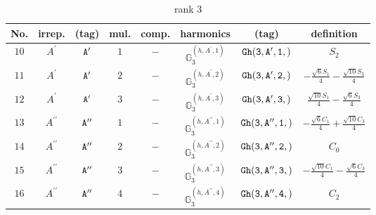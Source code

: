 \documentclass[fleqn,8pt]{jsarticle}
\begin{document}
\begin{table}[ht!]
\begin{center}
\caption{rank 3}
\renewcommand{\arraystretch}{1.3}
\begin{tabular}{cccccccc} \hline \hline
No. & irrep. & (tag) & mul. & comp. & harmonics & (tag) & definition \\ \hline
$ 10 $ & $ A^{\prime} $ & $ {\tt A'} $ & $ 1 $ & $ - $ & $ \mathbb{G}_{3}^{(h,A^{\prime},1)} $ & $ {\tt Gh(3,A',1,)} $ & $ S_{2} $ \\
$ 11 $ & $ A^{\prime} $ & $ {\tt A'} $ & $ 2 $ & $ - $ & $ \mathbb{G}_{3}^{(h,A^{\prime},2)} $ & $ {\tt Gh(3,A',2,)} $ & $ - \frac{\sqrt{6} S_{1}}{4} - \frac{\sqrt{10} S_{3}}{4} $ \\
$ 12 $ & $ A^{\prime} $ & $ {\tt A'} $ & $ 3 $ & $ - $ & $ \mathbb{G}_{3}^{(h,A^{\prime},3)} $ & $ {\tt Gh(3,A',3,)} $ & $ \frac{\sqrt{10} S_{1}}{4} - \frac{\sqrt{6} S_{3}}{4} $ \\
$ 13 $ & $ A^{\prime\prime} $ & $ {\tt A''} $ & $ 1 $ & $ - $ & $ \mathbb{G}_{3}^{(h,A^{\prime\prime},1)} $ & $ {\tt Gh(3,A'',1,)} $ & $ - \frac{\sqrt{6} C_{1}}{4} + \frac{\sqrt{10} C_{3}}{4} $ \\
$ 14 $ & $ A^{\prime\prime} $ & $ {\tt A''} $ & $ 2 $ & $ - $ & $ \mathbb{G}_{3}^{(h,A^{\prime\prime},2)} $ & $ {\tt Gh(3,A'',2,)} $ & $ C_{0} $ \\
$ 15 $ & $ A^{\prime\prime} $ & $ {\tt A''} $ & $ 3 $ & $ - $ & $ \mathbb{G}_{3}^{(h,A^{\prime\prime},3)} $ & $ {\tt Gh(3,A'',3,)} $ & $ - \frac{\sqrt{10} C_{1}}{4} - \frac{\sqrt{6} C_{3}}{4} $ \\
$ 16 $ & $ A^{\prime\prime} $ & $ {\tt A''} $ & $ 4 $ & $ - $ & $ \mathbb{G}_{3}^{(h,A^{\prime\prime},4)} $ & $ {\tt Gh(3,A'',4,)} $ & $ C_{2} $ \\
 \hline \hline
\end{tabular}
\end{center}
\end{table}
\end{document}
